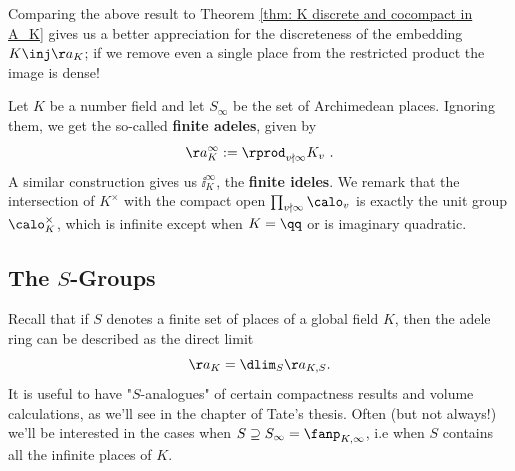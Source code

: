 \documentclass[11pt, x11names, openany]{book}
\begin{document}
Comparing the above result to Theorem \ref{thm: K discrete and cocompact in A_K} gives us a better appreciation for the discreteness of the embedding $K \inj \aa_K$; if we remove even a single place from the restricted product the image is dense!

\begin{example}
    \label{example: finite adeles and ideles}
Let $K$ be a number field and let $S_\infty$ be the set of Archimedean places. Ignoring them, we get the so-called \textbf{finite adeles}, given by
\begin{equation*}
    \aa_K^{\infty} := \rprod_{v \nmid \infty } K_v \ .
\end{equation*}
A similar construction gives us $\ii_K^{\infty}$, the \textbf{finite ideles}. We remark that the intersection of $K^\times$ with the compact open $\prod_{v \nmid \infty } \calo_v$ is exactly the unit group $\calo_K^\times$, which is infinite except when $K = \qq$ or is imaginary quadratic.
\end{example}


\subsection{The $S$-Groups}
\label{subsection: S-Groups}

Recall that if $S$ denotes a finite set of places of a global field $K$, then the adele ring can be described as the direct limit
\begin{equation*}
    \aa_K = \dlim_{S} \aa_{K, S}.
\end{equation*}
It is useful to have "$S$-analogues" of certain compactness results and volume calculations, as we'll see in the chapter of Tate's thesis. Often (but not always!) we'll be interested in the cases when $S \supseteq S_\infty = \fanp_{K, \infty}$, i.e when $S$ contains all the infinite places of $K$.
\end{document}
